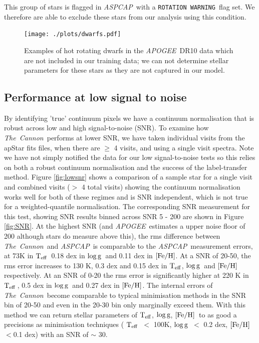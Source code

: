 \documentclass[12pt, preprint]{aastex}
\newcommand{\teff}{\mbox{$\rm T_{eff}$}}
\newcommand{\feh}{\mbox{$\rm [Fe/H]$}}
\newcommand{\logg}{\mbox{$\rm \log g$}}
\newcommand{\tc}{\textsl{The~Cannon}}
\newcommand{\apogee}{\textsl{APOGEE}}
\newcommand{\aspcap}{\textsl{ASPCAP}}
\newcommand{\rotwarn}{\texttt{ROTATION WARNING}}
\begin{document}
This group of stars is flagged in \aspcap\ with a \rotwarn\ flag set. We therefore are able to exclude these stars from our analysis using this condition. 
 
 \begin{figure}[h]
 \texttt{[image: ./plots/dwarfs.pdf]}
  \caption{Examples of hot rotating dwarfs in the \apogee\ DR10 data which are not included in our training data; we can not determine stellar parameters for these stars as they are not captured in our model.}
\label{fig:dwarfs}
\end{figure}


 \subsection{Performance at low signal to noise}

By identifying 'true' continuum pixels we have a continuum normalisation that is robust across low and high signal-to-noise (SNR). To examine how \tc\ performs at lower SNR, we have taken individual visits from the apStar fits files, when there are $\ge$ 4 visits, and using a single visit spectra. Note we have not simply notified the data for our low signal-to-noise tests so this relies on both a robust continuum normalisation and the success of the label-transfer method. Figure \ref{fig:lowsnr} shows a comparison of a sample star for a single visit and combined visits ($>$ 4 total visits) showing the continuum normalisation works well for both of these regimes and is SNR independent, which is not true for a weighted-quantile normalisation. The corresponding SNR measurement for this test,  showing SNR results binned  across SNR 5 - 200 are shown in Figure \ref{fig:SNR}.  At the highest SNR (and \apogee\ estimates a upper noise floor of 200 although stars do measure above this), the rms difference between \tc\ and \aspcap\ is comparable to the \aspcap\ measurement errors, at 73K in \teff\, 0.18 dex in \logg\ and 0.11 dex in \feh.  At a SNR of 20-50, the rms error increases to 130 K, 0.3 dex and 0.15 dex in \teff, \logg\ and \feh\, respectively. At an SNR of 0-20 the rms error is significantly higher at 220 K in \teff\,, 0.5 dex in \logg\ and 0.27 dex in \feh. The internal errors of \tc\ become comparable to typical minimisation methods in the SNR bin of 20-50 and even in the 20-30 bin only marginally exceed them. With this method we can return stellar parameters of \teff, \logg, \feh\ to as good a precisions as minimisation techniques ( \teff\ $<$ 100K, \logg\ $<$ 0.2 dex, \feh\ $< $0.1 dex) with an SNR of $\sim$ 30. 
 
\end{document}
